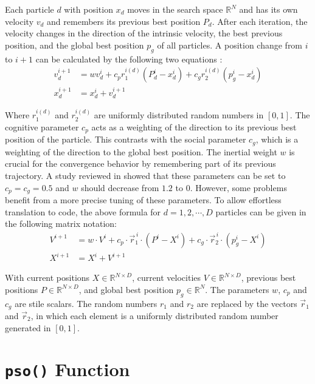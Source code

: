 \documentclass[
  oneside]{book}
\begin{document}
Each particle \(d\) with position \(x_d\) moves in the search space \(\mathbb{R}^N\) and has its own velocity \(v_d\) and remembers its previous best position \(P_d\). After each iteration, the velocity changes in the direction of the intrinsic velocity, the best previous position, and the global best position \(p_g\) of all particles. A position change from \(i\) to \(i+1\) can be calculated by the following two equations \citep{PaVr2002}:
\begin{align*}
  v_d^{i+1} &= wv_d^{i} + c_p r_1^{i(d)} (P_d^i - x_d^i) + c_g r_2^{i(d)} (p_g^i - x_d^i) \\
  x_d^{i+1} &= x_d^i + v_d^{i+1}
\end{align*}

Where \(r_1^{i(d)}\) and \(r_2^{i(d)}\) are uniformly distributed random numbers in \([0, 1]\). The cognitive parameter \(c_p\) acts as a weighting of the direction to its previous best position of the particle. This contrasts with the social parameter \(c_g\), which is a weighting of the direction to the global best position. The inertial weight \(w\) is crucial for the convergence behavior by remembering part of its previous trajectory. A study reviewed in \citep{PaVr2002} showed that these parameters can be set to \(c_p=c_g=0.5\) and \(w\) should decrease from \(1.2\) to \(0\). However, some problems benefit from a more precise tuning of these parameters. To allow effortless translation to code, the above formula for \(d = 1, 2, \cdots, D\) particles can be given in the following matrix notation:
\begin{align*}
  V^{i+1} &= w \cdot V^{i} + c_p \cdot \vec{r}_1^{\,i} \cdot (P^i-X^i) + c_g \cdot \vec{r}_2^{\,i} \cdot (p_g^i - X^i) \\
  X^{i+1} &= X^i + V^{i+1}
\end{align*}

With current positions \(X \in \mathbb{R}^{N \times D}\), current velocities \(V \in \mathbb{R}^{N \times D}\), previous best positions \(P \in \mathbb{R}^{N \times D}\), and global best position \(p_g \in \mathbb{R}^{N}\). The parameters \(w\), \(c_p\) and \(c_g\) are stile scalars. The random numbers \(r_1\) and \(r_2\) are replaced by the vectors \(\vec{r}_1\) and \(\vec{r}_2\), in which each element is a uniformly distributed random number generated in \([0, 1]\).

\hypertarget{pso-function}{%
\section{\texorpdfstring{\texttt{pso()} Function}{pso() Function}}\label{pso-function}}
\end{document}
